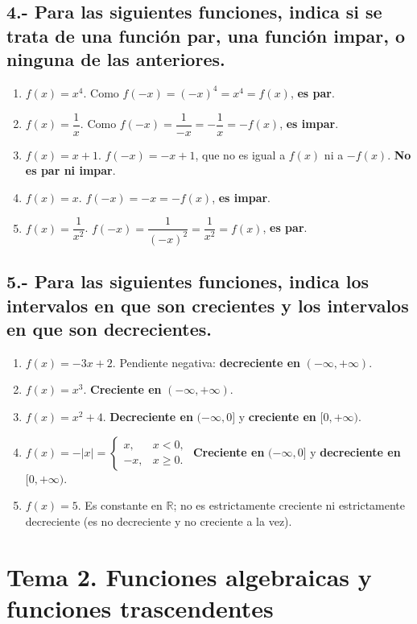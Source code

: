 \documentclass[12pt, letterpaper]{article}
\makeatletter
\renewcommand{\alph}[1]{\expandafter\@alphlatin\csname c@#1\endcsname}
\newcommand{\@alphlatin}[1]{\ifcase#1\or a\or b\or c\or d\or e\or f\or g\or h\or i\or j\or k\or l\or m\or n\or o\or p\or q\or r\or s\or t\or u\or v\or w\or x\or y\or z\else\@ctrerr\fi}
\newcommand{\R}{\mathbb{R}}
\makeatother
\begin{document}
\subsection*{4.- Para las siguientes funciones, indica si se trata de una función par, una función impar, o ninguna de las anteriores.}
\begin{enumerate}[label=\alph*)]
  \item $f(x)=x^4$. Como $f(-x)=(-x)^4=x^4=f(x)$, \textbf{es par}.
  \item $f(x)=\dfrac1x$. Como $f(-x)=\dfrac1{-x}=-\dfrac1x=-f(x)$, \textbf{es impar}.
  \item $f(x)=x+1$. $f(-x)=-x+1$, que no es igual a $f(x)$ ni a $-f(x)$. \textbf{No es par ni impar}.
  \item $f(x)=x$. $f(-x)=-x=-f(x)$, \textbf{es impar}.
  \item $f(x)=\dfrac1{x^2}$. $f(-x)=\dfrac1{(-x)^2}=\dfrac1{x^2}=f(x)$, \textbf{es par}.
\end{enumerate}

\subsection*{5.- Para las siguientes funciones, indica los intervalos en que son crecientes y los intervalos en que son decrecientes.}
\begin{enumerate}[label=\alph*)]
  \item $f(x)=-3x+2$. Pendiente negativa: \textbf{decreciente en }$(-\infty,+\infty)$.
  \item $f(x)=x^3$. \textbf{Creciente en }$(-\infty,+\infty)$.
  \item $f(x)=x^2+4$. \textbf{Decreciente en }$(-\infty,0]$ y \textbf{creciente en }$[0,+\infty)$.
  \item $f(x)=-|x|=\begin{cases}x,&x<0,\\-x,&x\geq0.\end{cases}$ \textbf{Creciente en }$(-\infty,0]$ y \textbf{decreciente en }$[0,+\infty)$.
  \item $f(x)=5$. Es constante en $\R$; no es estrictamente creciente ni estrictamente decreciente (es no decreciente y no creciente a la vez).
\end{enumerate}


\newpage
\section{Tema 2. Funciones algebraicas y funciones trascendentes}
\end{document}
